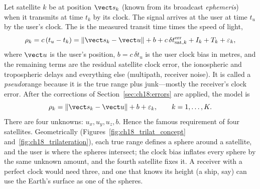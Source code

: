 Let satellite $k$ be at position $\vect s_k$ (known from its broadcast \emph{ephemeris}) when it
transmits at time $t_k$ by its clock. The signal arrives at the user at time $t_u$ by the
user's clock. The  is the measured transit time times the speed of light,
\begin{equation}
\rho_k=c\,(t_u-t_k)=\|\vect s_k-\vect u\|+b+c\,\delta t_{\text{sat},k}^{\text{err}}+I_k+T_k+\varepsilon_k,
\label{eq:ch18:pseudorange}
\end{equation}
where $\vect u$ is the user's position, $b=c\,\delta t_u$ is the user clock bias in metres,
and the remaining terms are the residual satellite clock error, the ionospheric and
tropospheric delays and everything else (multipath, receiver noise). It is called a
\emph{pseudo}range because it is the true range plus junk---mostly the receiver's clock error.
After the corrections of Section~\ref{sec:ch18:errors} are applied, the model is
\begin{equation}
\rho_k=\|\vect s_k-\vect u\|+b+\varepsilon_k,\qquad k=1,\dots,K.
\label{eq:ch18:prmodel}
\end{equation}
There are four unknowns: $u_x,u_y,u_z,b$. Hence the famous requirement of four satellites.
Geometrically (Figures~\ref{fig:ch18_trilat_concept} and~\ref{fig:ch18_trilateration}), each true
range defines a sphere around a satellite, and the user is where the spheres intersect; the clock
bias inflates every sphere by the same unknown amount, and the fourth satellite fixes it. A
receiver with a perfect clock would need three, and one that knows its height (a ship, say) can use
the Earth's surface as one of the spheres.


